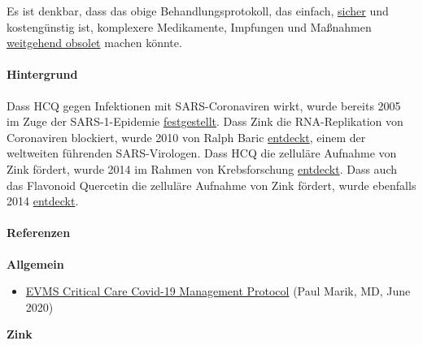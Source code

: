 Es ist denkbar, dass das obige Behandlungsprotokoll, das einfach,
\href{https://swprs.files.wordpress.com/2020/07/hcq-white-paper-dr-simone-gold.pdf}{sicher}
und kostengünstig ist, komplexere Medikamente, Impfungen und Maßnahmen
\href{https://www.newsweek.com/key-defeating-covid-19-already-exists-we-need-start-using-it-opinion-1519535}{weitgehend
obsolet} machen könnte.

\hypertarget{hintergrund}{%
\paragraph{Hintergrund}\label{hintergrund}}

Dass HCQ gegen Infektionen mit SARS-Coronaviren wirkt, wurde bereits
2005 im Zuge der SARS-1-Epidemie
\href{https://www.ncbi.nlm.nih.gov/pmc/articles/PMC1232869/}{festgestellt}.
Dass Zink die RNA-Replikation von Coronaviren blockiert, wurde 2010 von
Ralph Baric
\href{https://www.ncbi.nlm.nih.gov/pmc/articles/PMC2973827/}{entdeckt},
einem der weltweiten führenden SARS-Virologen. Dass HCQ die zelluläre
Aufnahme von Zink fördert, wurde 2014 im Rahmen von Krebsforschung
\href{https://journals.plos.org/plosone/article?id=10.1371/journal.pone.0109180}{entdeckt}.
Dass auch das Flavonoid Quercetin die zelluläre Aufnahme von Zink
fördert, wurde ebenfalls 2014
\href{https://pubs.acs.org/doi/10.1021/jf5014633}{entdeckt}.

\hypertarget{referenzen}{%
\paragraph{Referenzen}\label{referenzen}}

\textbf{Allgemein}

\begin{itemize}
\tightlist
\item
  \href{https://www.evms.edu/covid-19/covid_care_for_clinicians/}{EVMS
  Critical Care Covid-19 Management Protocol} (Paul Marik, MD, June
  2020)
\end{itemize}

\textbf{Zink}

